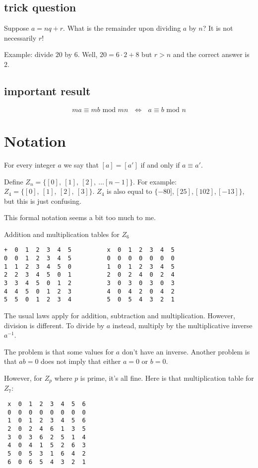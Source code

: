 \documentclass[11pt, oneside]{article}
\begin{document}
\subsection*{trick question}
Suppose $a = nq + r$.  What is the remainder upon dividing $a$ by $n$?  It is not necessarily $r$!

Example:  divide $20$ by $6$.  Well, $20 = 6 \cdot 2 + 8$ but $r > n$ and the correct answer is $2$. 

\subsection*{important result}
\[ ma \equiv mb \text{ mod } mn \ \ \  \iff \ \ \ a \equiv b \text{ mod } n \]

\section*{Notation}
For every integer $a$ we say that $[a] = [a']$ if and only if $a \equiv a'$.

Define $Z_n = \{ [0], \ [1], \ [2], \ \dots [n-1] \}$. For example:  $Z_4 = \{ [0],\ [1], \ [2], \ [3] \}$.  $Z_4$ is also equal to $\{−80],[25],[102],[−13]\}$, but this is just confusing.

This formal notation seems a bit too much to me.

Addition and multiplication tables for $Z_6$

\begin{verbatim}
+  0  1  2  3  4  5          x  0  1  2  3  4  5
0  0  1  2  3  4  5          0  0  0  0  0  0  0
1  1  2  3  4  5  0          1  0  1  2  3  4  5
2  2  3  4  5  0  1          2  0  2  4  0  2  4
3  3  4  5  0  1  2          3  0  3  0  3  0  3
4  4  5  0  1  2  3          4  0  4  2  0  4  2
5  5  0  1  2  3  4          5  0  5  4  3  2  1
\end{verbatim}

The usual laws apply for addition, subtraction and multiplication.  However, division is different.  To divide by $a$ instead, multiply by the multiplicative inverse $a^{-1}$.

The problem is that some values for $a$ don't have an inverse.  Another problem is that $ab = 0$ does not imply that either $a = 0$ or $b = 0$.

However, for $Z_p$ where $p$ is prime, it's all fine.  Here is that multiplication table for $Z_7$:

\begin{verbatim}
 x  0  1  2  3  4  5  6
 0  0  0  0  0  0  0  0
 1  0  1  2  3  4  5  6
 2  0  2  4  6  1  3  5
 3  0  3  6  2  5  1  4
 4  0  4  1  5  2  6  3  
 5  0  5  3  1  6  4  2 
 6  0  6  5  4  3  2  1
\end{verbatim}
\end{document}
